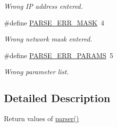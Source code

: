 \begin{DoxyCompactItemize}
\begin{DoxyCompactList}\small\item\em Wrong I\-P address entered. \end{DoxyCompactList}\item 
\hypertarget{group___return_parser_ga06ce470ce75d11df137db28e4ab58066}{\#define \hyperlink{group___return_parser_ga06ce470ce75d11df137db28e4ab58066}{P\-A\-R\-S\-E\-\_\-\-E\-R\-R\-\_\-\-M\-A\-S\-K}~4}\label{group___return_parser_ga06ce470ce75d11df137db28e4ab58066}

\begin{DoxyCompactList}\small\item\em Wrong network mask entered. \end{DoxyCompactList}\item 
\hypertarget{group___return_parser_ga1b8c6e128cf996fcb737414b0d6d512a}{\#define \hyperlink{group___return_parser_ga1b8c6e128cf996fcb737414b0d6d512a}{P\-A\-R\-S\-E\-\_\-\-E\-R\-R\-\_\-\-P\-A\-R\-A\-M\-S}~5}\label{group___return_parser_ga1b8c6e128cf996fcb737414b0d6d512a}

\begin{DoxyCompactList}\small\item\em Wrong parameter list. \end{DoxyCompactList}\end{DoxyCompactItemize}


\subsection{Detailed Description}
Return values of \hyperlink{cli_8c_acc286b66b5b52e4d8d11e5f6990ce425}{parser()} 